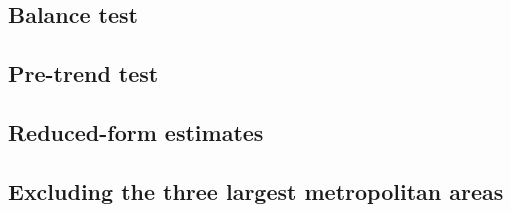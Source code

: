 \documentclass[12pt]{article}
\begin{document}
\subsection{Balance test} \label{balance_test}

\begin{table}[H]
    \caption{Balance test: Shift-Share instrument and predetermined market characteristics}
    \label{balance_test_table}
    \centering
    \small
    
\end{table}

\subsection{Pre-trend test} \label{pretrend_test_section}

\begin{table}[H]
    \caption{Pre-trend test: main estimates with the lagged outcome change as a control}
    \label{pretrend_test_table}
    \centering
    \small
    
\end{table}

\subsection{Reduced-form estimates} \label{reduced_form}

\begin{table}[H]
    \caption{Reduced-form: Shift-Share instrument and local labor market outcomes}
    \label{reduced_form_table}
    \centering
    \small
    
\end{table}

\subsection{Excluding the three largest metropolitan areas} \label{iv_nometros}

\begin{table}[H]
    \caption{Shift-Share IV estimates excluding the three largest metropolitan areas}
    \label{iv_nometros_table}
    \centering
    \small
    
\end{table}

\end{document}
